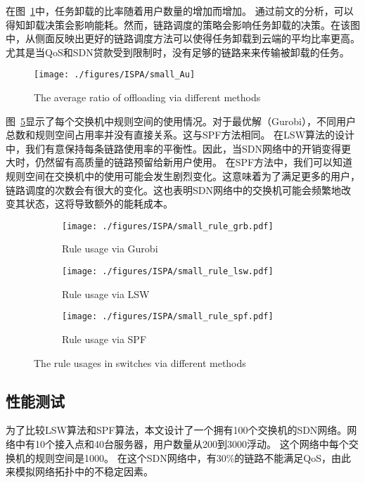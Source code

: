 在图~\ref{fig_smallAu}中，任务卸载的比率随着用户数量的增加而增加。 通过前文的分析，可以得知卸载决策会影响能耗。然而，链路调度的策略会影响任务卸载的决策。在该图中，从侧面反映出更好的链路调度方法可以使得任务卸载到云端的平均比率更高。尤其是当QoS和SDN贷款受到限制时，没有足够的链路来来传输被卸载的任务。

\begin{figure}[!h]
\centering
\texttt{[image: ./figures/ISPA/small\_Au]}
\vspace{-1em}
\caption{The average ratio of offloading via different methods}
\vspace{-1.5em}
\label{fig_smallAu}
\end{figure}

图~\ref{fig_smallrule}显示了每个交换机中规则空间的使用情况。对于最优解（Gurobi），不同用户总数和规则空间占用率并没有直接关系。这与SPF方法相同。 在LSW算法的设计中，我们有意保持每条链路使用率的平衡性。因此，当SDN网络中的开销变得更大时，仍然留有高质量的链路预留给新用户使用。 在SPF方法中，我们可以知道规则空间在交换机中的使用可能会发生剧烈变化。这意味着为了满足更多的用户，链路调度的次数会有很大的变化。这也表明SDN网络中的交换机可能会频繁地改变其状态，这将导致额外的能耗成本。

\begin{figure}[!h]
  \centering
  \begin{subfigure}[b]{0.32\linewidth}
    \texttt{[image: ./figures/ISPA/small\_rule\_grb.pdf]}
    \label{fig_smallNetworkRG}
    \caption{Rule usage via Gurobi}
  \end{subfigure}
  \begin{subfigure}[b]{0.32\linewidth}
    \texttt{[image: ./figures/ISPA/small\_rule\_lsw.pdf]}
    \label{fig_smallNetworkRL}
    \caption{Rule usage via LSW}
  \end{subfigure}
  \begin{subfigure}[b]{0.32\linewidth}
    \texttt{[image: ./figures/ISPA/small\_rule\_spf.pdf]}
    \label{fig_smallNetworkRS}
    \caption{Rule usage via SPF}
  \end{subfigure}
  \caption{The rule usages in switches via different methods}
  \label{fig_smallrule}
\end{figure}

\subsection{性能测试}

为了比较LSW算法和SPF算法，本文设计了一个拥有100个交换机的SDN网络。网络中有10个接入点和40台服务器，用户数量从200到3000浮动。 这个网络中每个交换机的规则空间是1000。 在这个SDN网络中，有30\%的链路不能满足QoS，由此来模拟网络拓扑中的不稳定因素。

